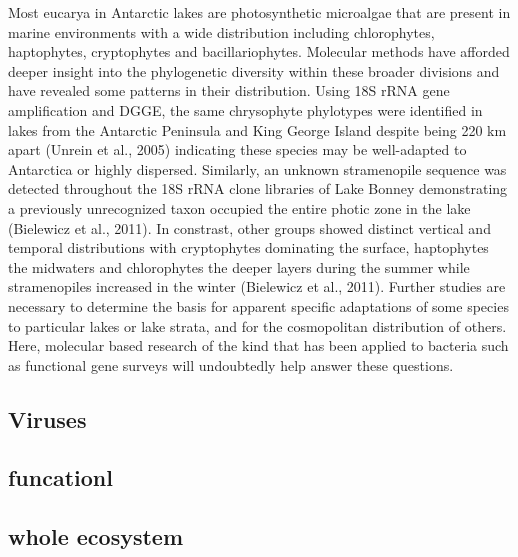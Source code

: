 \documentclass{book}
\begin{document}
Most eucarya in Antarctic lakes are photosynthetic microalgae that are present in marine environments with a wide distribution including chlorophytes, haptophytes, cryptophytes and bacillariophytes.
Molecular methods have afforded deeper insight into the phylogenetic diversity within these broader divisions and have revealed some patterns in their distribution. 
Using 18S rRNA gene amplification and DGGE, the same chrysophyte phylotypes were identified in lakes from the Antarctic Peninsula and King George Island despite being 220 km apart (Unrein et al., 2005) indicating these species may be well-adapted to Antarctica or highly dispersed.
Similarly, an unknown stramenopile sequence was detected throughout the 18S rRNA clone libraries of Lake Bonney demonstrating a previously unrecognized taxon occupied the entire photic zone in the lake (Bielewicz et al., 2011). 
In constrast, other groups showed distinct vertical and temporal distributions with cryptophytes dominating the surface, haptophytes the midwaters and chlorophytes the deeper layers during the summer while stramenopiles increased in the winter (Bielewicz et al., 2011). 
Further studies are necessary to determine the basis for apparent specific adaptations of some species to particular lakes or lake strata, and for the cosmopolitan distribution of others.
Here, molecular based research of the kind that has been applied to bacteria such as functional gene surveys will undoubtedly help answer these questions.

\subsection{Viruses}

\subsection{funcationl}

\subsection{whole ecosystem}
\end{document}
